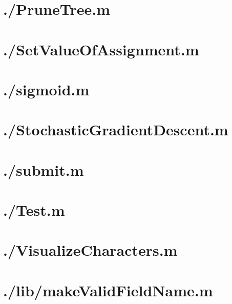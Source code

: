 \documentclass{article}
\begin{document}
\section{./PruneTree.m}

\section{./SetValueOfAssignment.m}

\section{./sigmoid.m}

\section{./StochasticGradientDescent.m}

\section{./submit.m}

\section{./Test.m}

\section{./VisualizeCharacters.m}

\section{./lib/makeValidFieldName.m}

\end{document}
